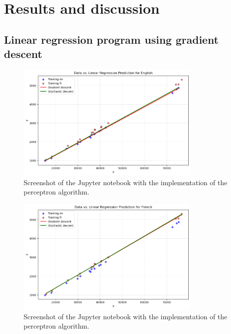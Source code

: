 \documentclass[a4paper]{article}
\begin{document}
 
\section{Results and discussion}


\subsection{Linear regression program using gradient descent}

\begin{figure}
    \centering
    \includegraphics[width=0.8\textwidth]{figures/Fit English.png}
    \caption{Screenshot of the Jupyter notebook with the implementation of the perceptron algorithm.}
    \label{fig:regression_English}
\end{figure}

\begin{figure}
    \centering
    \includegraphics[width=0.8\textwidth]{figures/Fit French.png}
    \caption{Screenshot of the Jupyter notebook with the implementation of the perceptron algorithm.}
    \label{fig:regression_French}
\end{figure}
\end{document}
